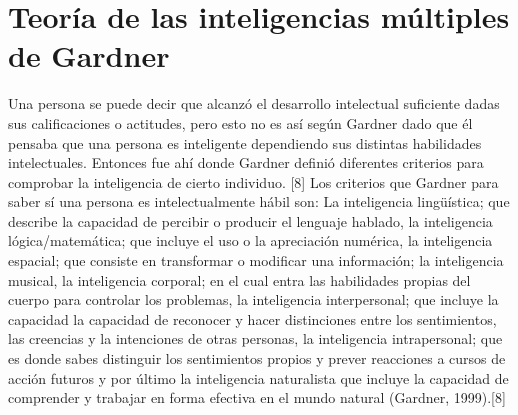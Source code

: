 \documentclass{bmcart}
\begin{document}
\section*{Teoría de las inteligencias múltiples de Gardner}

Una persona se puede decir que alcanzó el desarrollo intelectual suficiente dadas sus calificaciones o actitudes, pero esto no es así según Gardner dado que él pensaba que una persona es inteligente dependiendo sus distintas habilidades intelectuales. Entonces fue ahí donde Gardner definió diferentes criterios para comprobar la inteligencia de cierto individuo. [8]
	\newline
	\newline
Los criterios que Gardner para saber sí una persona es intelectualmente hábil son: La inteligencia lingüística; que describe la capacidad de percibir o producir el lenguaje hablado,  la inteligencia lógica/matemática; que incluye el uso o la apreciación numérica, la inteligencia espacial; que consiste en transformar o modificar una información; la inteligencia musical, la inteligencia corporal; en el cual entra las habilidades propias del cuerpo para controlar los problemas, la inteligencia interpersonal; que incluye la capacidad la capacidad de reconocer y hacer distinciones entre los sentimientos, las creencias y la intenciones de otras personas, la inteligencia intrapersonal; que es donde sabes distinguir los sentimientos propios y prever reacciones a cursos de acción futuros y por último la inteligencia naturalista que incluye la capacidad de comprender y trabajar en forma efectiva en el mundo natural (Gardner, 1999).[8]



\end{document}
